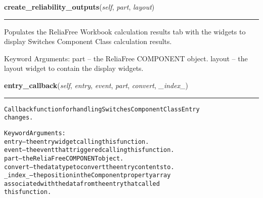     \label{reliafree:switches:switch:Switch:create_reliability_outputs}

    \vspace{0.5ex}

\hspace{.8\funcindent}\begin{boxedminipage}{\funcwidth}

    \raggedright \textbf{create\_reliability\_outputs}(\textit{self}, \textit{part}, \textit{layout})

    \vspace{-1.5ex}

    \rule{\textwidth}{0.5\fboxrule}
\setlength{\parskip}{2ex}
    Populates the ReliaFree Workbook calculation results tab with the 
    widgets to display Switches Component Class calculation results.

    Keyword Arguments: part   -- the ReliaFree COMPONENT object. layout -- 
    the layout widget to contain the display widgets.

\setlength{\parskip}{1ex}
    \end{boxedminipage}

    \label{reliafree:switches:switch:Switch:entry_callback}

    \vspace{0.5ex}

\hspace{.8\funcindent}\begin{boxedminipage}{\funcwidth}

    \raggedright \textbf{entry\_callback}(\textit{self}, \textit{entry}, \textit{event}, \textit{part}, \textit{convert}, \textit{\_index\_})

    \vspace{-1.5ex}

    \rule{\textwidth}{0.5\fboxrule}
\setlength{\parskip}{2ex}
\begin{alltt}
Callback function for handling Switches Component Class Entry
changes.

Keyword Arguments:
  entry -- the entry widget calling this function.
  event -- the event that triggered calling this function.
   part -- the ReliaFree COMPONENT object.
convert -- the data type to convert the entry contents to.
\_index\_ -- the position in the Component property array
           associated with the data from the entry that called
           this function.
\end{alltt}

\setlength{\parskip}{1ex}
    \end{boxedminipage}

